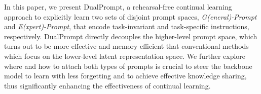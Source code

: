 \documentclass[runningheads]{llncs}
\newcommand{\zifeng}[1]{\textcolor{red}{Zifeng: #1}}
\newcommand{\method}{DualPrompt\xspace}
\begin{document}
In this paper, we present \method, a rehearsal-free continual learning approach to explicitly learn two sets of disjoint prompt spaces, \emph{G(eneral)-Prompt} and \emph{E(xpert)-Prompt}, that encode task-invariant and task-specific instructions, respectively. \method directly decouples the higher-level prompt space, which turns out to be more effective and memory efficient that conventional methods which focus on the lower-level latent representation space.
We further explore where and how to attach both types of prompts is crucial to steer the backbone model to learn with less forgetting and to achieve effective knowledge sharing, thus significantly enhancing the effectiveness of continual learning. 
 
\end{document}
